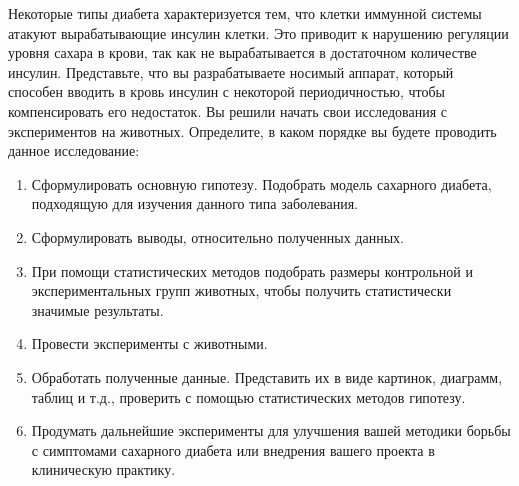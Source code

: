 
Некоторые типы
диабета характеризуется тем, что клетки иммунной системы атакуют вырабатывающие
инсулин клетки. Это приводит к нарушению регуляции уровня сахара в крови, так
как не вырабатывается в достаточном количестве инсулин. Представьте, что вы
разрабатываете носимый аппарат, который способен вводить в кровь инсулин с
некоторой периодичностью, чтобы компенсировать его недостаток. Вы решили начать
свои исследования с экспериментов на животных. Определите, в каком порядке вы
будете проводить данное исследование:

\begin{enumerate}
    \item Сформулировать основную гипотезу. Подобрать модель сахарного диабета, подходящую для изучения данного типа заболевания.
    \item Сформулировать выводы, относительно полученных данных.
    \item При помощи статистических методов подобрать размеры контрольной и экспериментальных групп животных, чтобы получить статистически значимые результаты.
    \item Провести эксперименты с животными.
    \item Обработать полученные данные. Представить их в виде картинок, диаграмм, таблиц и т.д., проверить с помощью статистических методов гипотезу.
    \item Продумать дальнейшие эксперименты для улучшения вашей методики борьбы с симптомами сахарного диабета или внедрения вашего проекта в клиническую практику.
\end{enumerate}

\explanationSection

